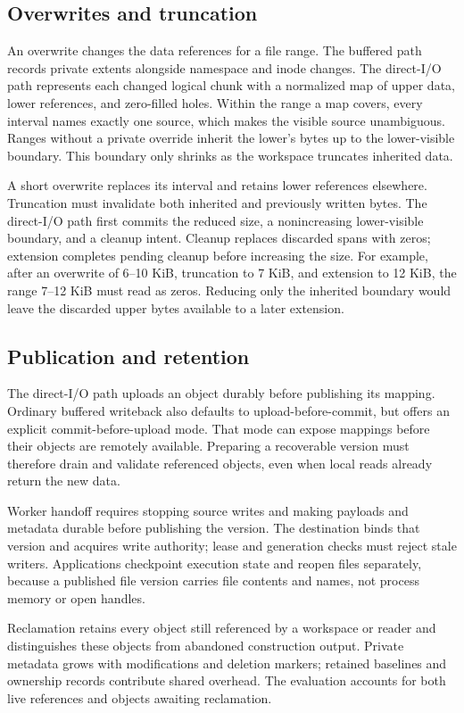 \subsection{Overwrites and truncation}

An overwrite changes the data references for a file range. The buffered
path records private extents alongside namespace and inode changes.
The direct-I/O path represents each changed logical chunk with a
normalized map of upper data, lower references, and zero-filled holes.
Within the range a map covers, every interval names exactly one source,
which makes the visible source unambiguous. Ranges without a private
override inherit the lower's bytes up to the lower-visible boundary.
This boundary only shrinks as the workspace truncates inherited data.

A short overwrite replaces its interval and retains lower references
elsewhere. Truncation must invalidate both inherited and previously
written bytes. The direct-I/O path first commits the reduced size,
a nonincreasing lower-visible boundary, and a cleanup intent. Cleanup
replaces discarded spans with zeros; extension completes pending cleanup
before increasing the size. For example, after an overwrite of
6--10 KiB, truncation to 7 KiB, and extension to 12 KiB, the range
7--12 KiB must read as zeros. Reducing only the inherited boundary
would leave the discarded upper bytes available to a later extension.

\subsection{Publication and retention}

The direct-I/O path uploads an object durably before publishing its
mapping. Ordinary buffered writeback also defaults to upload-before-commit,
but offers an explicit commit-before-upload mode. That mode can expose
mappings before their objects are remotely available. Preparing a
recoverable version must therefore drain and validate referenced objects,
even when local reads already return the new data.

Worker handoff requires stopping source writes and making payloads and
metadata durable before publishing the version. The destination binds
that version and acquires write authority; lease and generation checks
must reject stale writers. Applications checkpoint execution state
and reopen files separately, because a published file version carries
file contents and names, not process memory or open handles.

Reclamation retains every object still referenced by a workspace or
reader and distinguishes these objects from abandoned construction output.
Private metadata grows with modifications and deletion markers; retained
baselines and ownership records contribute shared overhead. The evaluation
accounts for both live references and objects awaiting reclamation.
